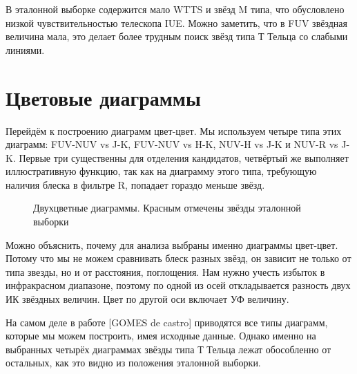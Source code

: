 В эталонной выборке содержится мало WTTS и звёзд M типа, что обусловлено низкой чувствительностью телескопа IUE. Можно заметить, что в FUV звёздная величина мала, это делает более трудным поиск звёзд типа Т Тельца со слабыми линиями.

\section{Цветовые диаграммы}
Перейдём к построению диаграмм цвет-цвет. Мы используем четыре типа этих диаграмм: FUV-NUV vs J-K, FUV-NUV vs H-K, NUV-H vs J-K и NUV-R vs J-K. Первые три существенны для отделения кандидатов, четвёртый же выполняет иллюстративную функцию, так как на диаграмму этого типа, требующую наличия блеска в фильтре R, попадает гораздо меньше звёзд.

\begin{figure}[ht]
\begin{minipage}[ht]{0.49\linewidth}
\end{minipage}
\hfill
\begin{minipage}[ht]{0.49\linewidth}
\end{minipage}
\begin{minipage}[ht]{0.49\linewidth}
\end{minipage}
\hfill
\begin{minipage}[ht]{0.49\linewidth}
\end{minipage}
\caption{Двухцветные диаграммы. Красным отмечены звёзды эталонной выборки}
\label{fig:colcol}
\end{figure}
Можно объяснить, почему для анализа выбраны именно диаграммы цвет-цвет. Потому что мы не можем сравнивать блеск разных звёзд, он зависит не только от типа звезды, но и от расстояния, поглощения. Нам нужно учесть избыток в инфракрасном диапазоне, поэтому по одной из осей откладывается разность двух ИК звёздных величин. Цвет по другой оси включает УФ величину.

На самом деле в работе [GOMES de castro]  приводятся все типы диаграмм, которые мы можем построить, имея исходные данные. Однако именно на выбранных четырёх диаграммах звёзды типа Т Тельца лежат обособленно от остальных, как это видно из положения эталонной выборки.

